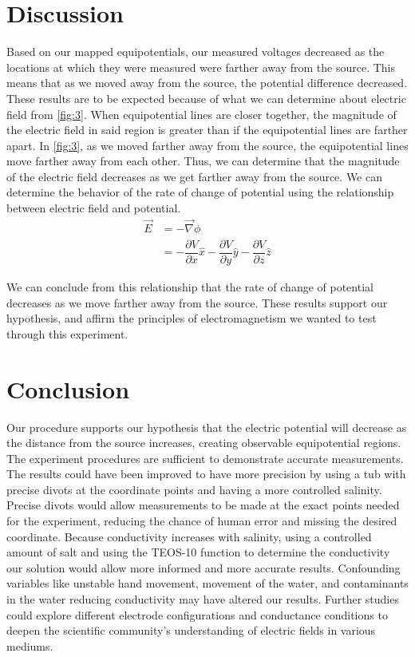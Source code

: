 ﻿\documentclass[10pt,journal]{IEEEtran}
\begin{document}
          





\section{Discussion}
Based on our mapped equipotentials, our measured voltages decreased as the locations at which they were measured were farther away from the source. This means that as we moved away from the source, the potential difference decreased. These results are to be expected because of what we can determine about electric field from \cref{fig:3}. When equipotential lines are closer together, the magnitude of the electric field in said region is greater than if the equipotential lines are farther apart. In \cref{fig:3}, as we moved farther away from the source, the equipotential lines move farther away from each other. Thus, we can determine that the magnitude of the electric field decreases as we get farther away from the source. We can determine the behavior of the rate of change of potential using the relationship between electric field and potential.
\begin{align}
\vec{E} &= - \vec{\nabla} \phi \\
&= - \dfrac{\partial V}{\partial x} \hat{x} - \dfrac{\partial V}{\partial y} \hat{y} - \dfrac{\partial V}{\partial z} \hat{z}
\label{eq:gradV}
\end{align}

We can conclude from this relationship that the rate of change of potential decreases as we move farther away from the source. These results support our hypothesis, and affirm the principles of electromagnetism we wanted to test through this experiment. 





\section{Conclusion}
Our procedure supports our hypothesis that the electric potential will decrease as the distance from the source increases, creating observable equipotential regions. The experiment procedures are sufficient to demonstrate accurate measurements. The results could have been improved to have more precision by using a tub with precise divots at the coordinate points and having a more controlled salinity. Precise divots would allow measurements to be made at the exact points needed  for the experiment, reducing the chance of human error and missing the desired coordinate. Because conductivity increases with salinity, using a controlled amount of salt and using the TEOS-10 function to determine the conductivity our solution would allow more informed and more accurate results. Confounding variables like unstable hand movement, movement of the water, and contaminants in the water reducing conductivity may have altered our results. Further studies could explore different electrode configurations and conductance conditions to deepen the scientific community’s understanding of electric fields in various mediums.
        
\end{document}
